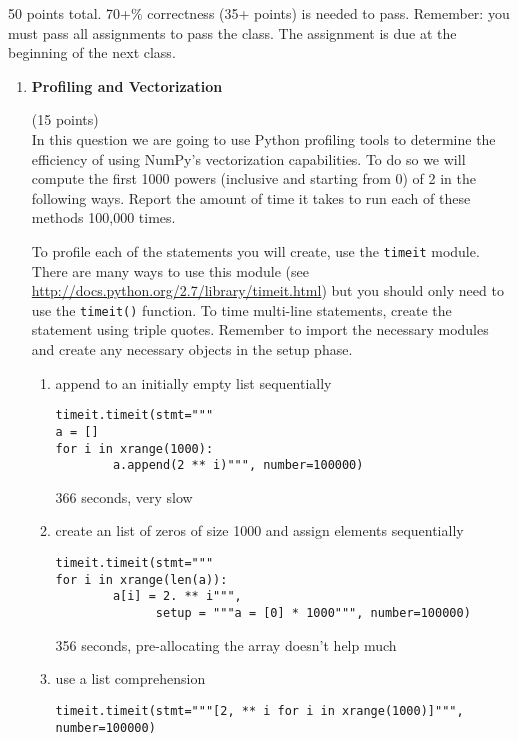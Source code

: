 \documentclass{article}
\newcounter{points}
\newcommand\setpoints[1]{\addtocounter{points}{#1}(#1 points)}
\begin{document}
\pagestyle{fancy}

50  points total.  70+\% correctness (35+ points) is needed to pass. Remember: you must pass all assignments to pass the class.  The assignment is due at the beginning of the next class.

\begin{enumerate}
\item \textbf{Profiling and Vectorization} \setpoints{15} \\
In this question we are going to use Python profiling tools to determine the efficiency of using NumPy's vectorization capabilities. To do so we will compute the first 1000 powers (inclusive and starting from 0) of 2 in the following ways. Report the amount of time it takes to run each of these methods 100,000 times.
\vspace{.1in}

To profile each of the statements you will create, use the \texttt{timeit} module. There are many ways to use this module (see
\url{ http://docs.python.org/2.7/library/timeit.html}) but you should only need to use the \texttt{timeit()} function. To time multi-line statements, create the statement using triple quotes. Remember to import the necessary modules and create any necessary objects in the setup phase.

\begin{enumerate}
\item append  to an initially empty list sequentially 

\begin{verbatim}
timeit.timeit(stmt="""
a = []
for i in xrange(1000):
        a.append(2 ** i)""", number=100000)       
\end{verbatim}
  366 seconds, very slow

\item create an list of zeros of size 1000 and assign elements sequentially

\begin{verbatim}
timeit.timeit(stmt="""
for i in xrange(len(a)):
        a[i] = 2. ** i""", 
              setup = """a = [0] * 1000""", number=100000)       
\end{verbatim}
356 seconds, pre-allocating the array doesn't help much


\item use a list comprehension

\begin{verbatim}
timeit.timeit(stmt="""[2, ** i for i in xrange(1000)]""", number=100000)
\end{verbatim}


\end{enumerate}
\end{enumerate}
\end{document}

